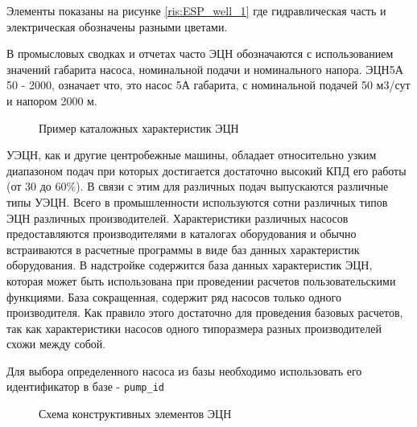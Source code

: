 Элементы показаны на рисунке \ref{ris:ESP_well_1} где гидравлическая часть и электрическая обозначены разными цветами.

В промысловых сводках и отчетах часто ЭЦН обозначаются с использованием значений габарита насоса, номинальной подачи и номинального напора. ЭЦН5А 50 - 2000, означает что, это насос 5А габарита, с номинальной подачей 50 м3/сут и напором 2000 м. 

\begin{figure}[H]
	\caption{Пример каталожных характеристик ЭЦН}
	\label{ris:novomet_ESP_80}
\end{figure}

УЭЦН, как и другие центробежные машины, обладает относительно узким диапазоном подач при которых достигается достаточно высокий КПД его работы (от 30 до 60\%). В связи с этим для различных подач выпускаются различные типы УЭЦН. Всего в промышленности используются сотни различных типов ЭЦН различных производителей. Характеристики различных насосов предоставляются производителями в каталогах оборудования и обычно встраиваются в расчетные программы в виде баз данных характеристик оборудования. В надстройке \unf{} содержится база данных характеристик ЭЦН, которая может быть использована при проведении расчетов пользовательскими функциями. База сокращенная, содержит ряд насосов только одного производителя. Как правило этого достаточно для проведения базовых расчетов, так как характеристики насосов одного типоразмера разных производителей схожи между собой. 

Для выбора определенного насоса из базы необходимо использовать его идентификатор в базе - \texttt{pump_id}

\begin{figure}[H]
	\begin{center}
		
		\caption{Схема конструктивных элементов ЭЦН}
		\label{ris:ESP_well_2}
	\end{center}
\end{figure}


